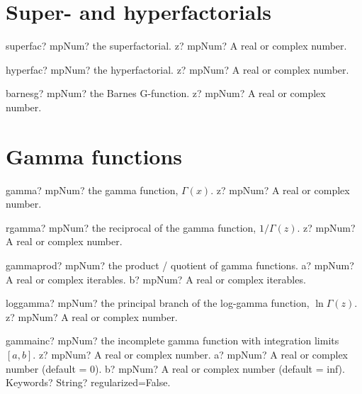 \documentclass[12pt,a4paper,openany]{book}
\begin{document}
\section{Super- and hyperfactorials}

\begin{mpFunctionsExtract}
\mpFunctionOne
{superfac? mpNum? the superfactorial.}
{z? mpNum? A real or complex number.}
\end{mpFunctionsExtract}

\begin{mpFunctionsExtract}
\mpFunctionOne
{hyperfac? mpNum? the hyperfactorial.}
{z? mpNum? A real or complex number.}
\end{mpFunctionsExtract}

\begin{mpFunctionsExtract}
\mpFunctionOne
{barnesg? mpNum? the Barnes G-function.}
{z? mpNum? A real or complex number.}
\end{mpFunctionsExtract}

\section{Gamma functions}

\begin{mpFunctionsExtract}
\mpFunctionOne
{gamma? mpNum? the gamma function, $\Gamma(x)$.}
{z? mpNum? A real or complex number.}
\end{mpFunctionsExtract}

\begin{mpFunctionsExtract}
\mpFunctionOne
{rgamma? mpNum? the reciprocal of the gamma function, $1/\Gamma(z)$.}
{z? mpNum? A real or complex number.}
\end{mpFunctionsExtract}

\begin{mpFunctionsExtract}
\mpFunctionTwo
{gammaprod? mpNum?  the  product / quotient of gamma functions.}
{a? mpNum? A real or complex iterables.}
{b? mpNum? A real or complex iterables.}
\end{mpFunctionsExtract}

\begin{mpFunctionsExtract}
\mpFunctionOne
{loggamma? mpNum? the principal branch of the log-gamma function, $\ln\Gamma(z)$.}
{z? mpNum? A real or complex number.}
\end{mpFunctionsExtract}

\begin{mpFunctionsExtract}
\mpFunctionFour
{gammainc? mpNum? the incomplete gamma function with integration limits $[a, b]$.}
{z? mpNum? A real or complex number.}
{a? mpNum? A real or complex number (default = 0).}
{b? mpNum? A real or complex number (default = inf).}
{Keywords? String?  regularized=False.}
\end{mpFunctionsExtract}
\end{document}

